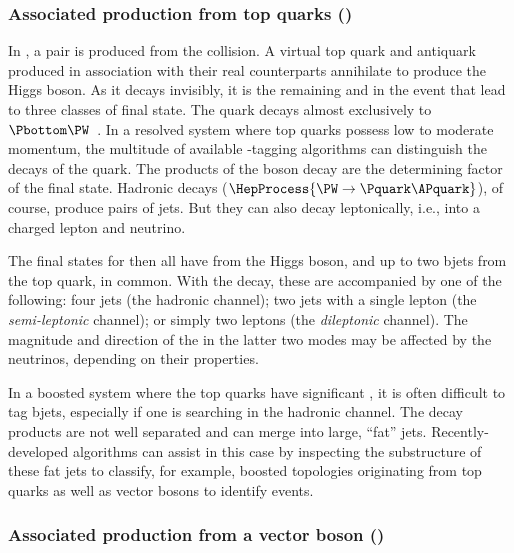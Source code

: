 

\subsubsection{Associated production from top quarks (\texorpdfstring{\ttH}{ttH})}
\label{subsubsec:theory_hinv_ttH_mode}

In \ttH, a \ttbar pair is produced from the collision. A virtual top quark \Ptop and antiquark \APtop produced in association with their real counterparts annihilate to produce the Higgs boson. As it decays invisibly, it is the remaining \Ptop and \APtop in the event that lead to three classes of final state. The \Ptop quark decays almost exclusively to $\Pbottom\PW$~\cite{PhysRevD.98.030001}. In a resolved system where top quarks possess low to moderate momentum, the multitude of available \Pbottom-tagging algorithms can distinguish the decays of the \Pbottom quark. The products of the \PW boson decay are the determining factor of the final state. Hadronic decays ($\HepProcess{\PW \to \Pquark\APquark}$), of course, produce pairs of \glspl{jet}. But they can also decay leptonically, i.e., into a charged lepton and neutrino.

The final states for \ttH then all have \ptvecmiss from the Higgs boson, and up to two \glspl{bjet} from the top quark, in common. With the \PW decay, these are accompanied by one of the following: four \glspl{jet} (the hadronic channel); two \glspl{jet} with a single lepton (the \emph{semi-leptonic} channel); or simply two leptons (the \emph{dileptonic} channel). The magnitude and direction of the \ptvecmiss in the latter two modes may be affected by the neutrinos, depending on their properties.

In a boosted system where the top quarks have significant \pt, it is often difficult to tag \glspl{bjet}, especially if one is searching in the hadronic channel. The decay products are not well separated and can merge into large, ``fat'' \glspl{jet}. Recently-developed algorithms can assist in this case by inspecting the substructure of these fat \glspl{jet} to classify, for example, boosted topologies originating from top quarks as well as vector bosons to identify \ttH events.




\subsubsection{Associated production from a vector boson (\texorpdfstring{\VH}{VH})}
\label{subsubsec:theory_hinv_VH_mode}

